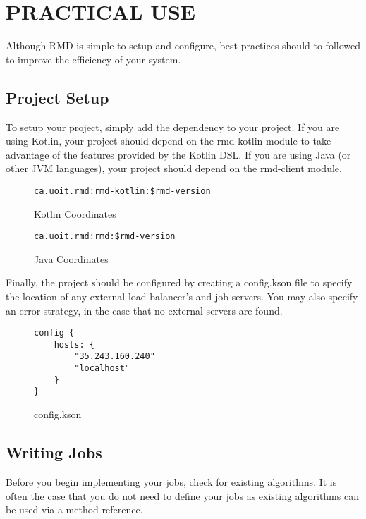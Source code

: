 \section{PRACTICAL USE}\label{sec:practicalUse}

Although RMD is simple to setup and configure,
best practices should to followed to improve the
efficiency of your system.


\subsection{Project Setup}\label{subsec:projectSetup}

To setup your project, simply add the dependency to your
project.
If you are using Kotlin, your project should depend
on the rmd-kotlin module to take advantage of
the features provided by the Kotlin DSL.
If you are using Java (or other JVM languages), your project
should depend on the rmd-client module.

\begin{figure}[H]
\caption{Kotlin Coordinates}
    \begin{lstlisting}
ca.uoit.rmd:rmd-kotlin:$rmd-version
    \end{lstlisting}
\end{figure}

\begin{figure}[H]
    \caption{Java Coordinates}
    \begin{lstlisting}
ca.uoit.rmd:rmd:$rmd-version
    \end{lstlisting}
\end{figure}

Finally, the project should be configured by creating
a config.kson file to specify the location of any
external load balancer's and job servers. You may also specify
an error strategy, in the case that no external servers are found.

\begin{figure}[H]
\caption{config.kson}
    \begin{lstlisting}
config {
    hosts: {
        "35.243.160.240"
        "localhost"
    }
}
    \end{lstlisting}
\end{figure}

\subsection{Writing Jobs}\label{subsec:writingJobs}
Before you begin implementing your jobs, check for
existing algorithms.
It is often the case that you do not need to define
your jobs as existing algorithms can be used via a method reference.

